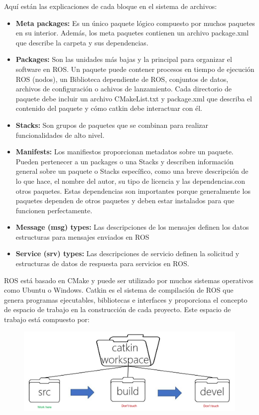             Aquí están las explicaciones de cada bloque en el sistema de archivos:
            \begin{itemize}
                \item {\textbf{Meta packages:} Es un único paquete lógico compuesto por muchos paquetes en su interior. Además, los meta paquetes contienen un archivo package.xml que describe la carpeta y sus dependencias.}
                \item {\textbf{Packages:} Son las unidades más bajas y la principal para organizar el software en ROS. Un paquete puede contener procesos en tiempo de ejecución ROS (nodos), un Biblioteca dependiente de ROS, conjuntos de datos, archivos de configuración o achivos de lanzamiento. Cada directorio de paquete debe incluir un archivo CMakeList.txt y package.xml que describa el contenido del paquete y cómo catkin debe interactuar con él.}
                \item {\textbf{Stacks:} Son grupos de paquetes que se combinan para realizar funcionalidades de alto nivel.}
                \item {\textbf{Manifests:} Los manifiestos proporcionan metadatos sobre un paquete. Pueden pertenecer a un packages o una Stacks y describen información general sobre un paquete o Stacks específico, como una breve descripción de lo que hace, el nombre del autor, su tipo de licencia y las dependencias.con otros paquetes. Estas dependencias son importantes porque generalmente los paquetes dependen de otros paquetes y deben estar instalados para que funcionen perfectamente.}
                \item {\textbf{Message (msg) types:} Las descripciones de los mensajes definen los datos estructuras para mensajes enviados en ROS}
                \item {\textbf{Service (srv) types:} Las descripciones de servicio definen la solicitud y estructuras de datos de respuesta para servicios en ROS.}
            \end{itemize}
            
            ROS está basado en CMake y puede ser utilizado por muchos sistemas operativos como Ubuntu o Windows. Catkin es el sistema de compilación de ROS que genera programas ejecutables, bibliotecas e interfaces y proporciona el concepto de espacio de trabajo en la construcción de cada proyecto. Este espacio de trabajo está compuesto por:
            
            \begin{figure}[htb]
                \centering
                \includegraphics[width=0.75\linewidth]{Main/Chapter3/Images3/n_s_a_3.png}
                \caption{}
                \label{f:Cap3_conceptos_3}
            \end{figure} 
            
